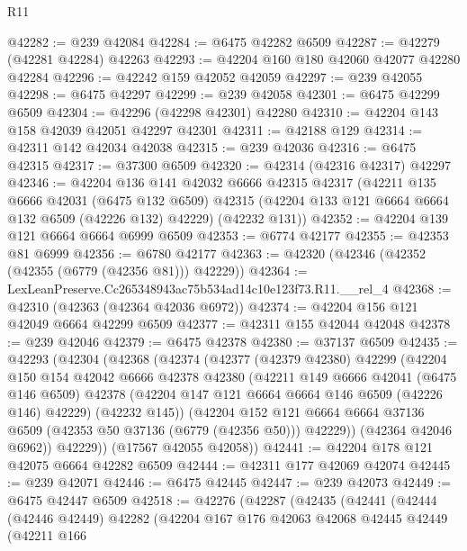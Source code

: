 \begin{lexlean}{R11}
\begin{coremodule}
@42282 := @239 @42084
@42284 := @6475 @42282 @6509
@42287 := @42279 (@42281 @42284) @42263
@42293 := @42204 @160 @180 @42060 @42077 @42280 @42284
@42296 := @42242 @159 @42052 @42059
@42297 := @239 @42055
@42298 := @6475 @42297
@42299 := @239 @42058
@42301 := @6475 @42299 @6509
@42304 := @42296 (@42298 @42301) @42280
@42310 := @42204 @143 @158 @42039 @42051 @42297 @42301
@42311 := @42188 @129
@42314 := @42311 @142 @42034 @42038
@42315 := @239 @42036
@42316 := @6475 @42315
@42317 := @37300 @6509
@42320 := @42314 (@42316 @42317) @42297
@42346 := @42204
    @136
    @141
    @42032
    @6666
    @42315
    @42317
    (@42211
      @135
      @6666
      @42031
      (@6475 @132 @6509)
      @42315
      (@42204 @133 @121 @6664 @6664 @132 @6509 (@42226 @132) @42229)
      (@42232 @131))
@42352 := @42204 @139 @121 @6664 @6664 @6999 @6509
@42353 := @6774 @42177
@42355 := @42353 @81 @6999
@42356 := @6780 @42177
@42363 := @42320 (@42346 (@42352 (@42355 (@6779 (@42356 @81))) @42229))
@42364 := LexLeanPreserve.Cc265348943ac75b534ad14c10e123f73.R11.__rel_4
@42368 := @42310 (@42363 (@42364 @42036 @6972))
@42374 := @42204 @156 @121 @42049 @6664 @42299 @6509
@42377 := @42311 @155 @42044 @42048
@42378 := @239 @42046
@42379 := @6475 @42378
@42380 := @37137 @6509
@42435 := @42293
    (@42304
      (@42368
        (@42374
          (@42377
            (@42379 @42380)
            @42299
            (@42204
              @150
              @154
              @42042
              @6666
              @42378
              @42380
              (@42211
                @149
                @6666
                @42041
                (@6475 @146 @6509)
                @42378
                (@42204 @147 @121 @6664 @6664 @146 @6509 (@42226 @146) @42229)
                (@42232 @145))
              (@42204
                @152
                @121
                @6664
                @6664
                @37136
                @6509
                (@42353 @50 @37136 (@6779 (@42356 @50)))
                @42229))
            (@42364 @42046 @6962))
          @42229))
      (@17567 @42055 @42058))
@42441 := @42204 @178 @121 @42075 @6664 @42282 @6509
@42444 := @42311 @177 @42069 @42074
@42445 := @239 @42071
@42446 := @6475 @42445
@42447 := @239 @42073
@42449 := @6475 @42447 @6509
@42518 := @42276
    (@42287
      (@42435
        (@42441
          (@42444
            (@42446 @42449)
            @42282
            (@42204
              @167
              @176
              @42063
              @42068
              @42445
              @42449
              (@42211
                @166

\end{coremodule}
\end{lexlean}
